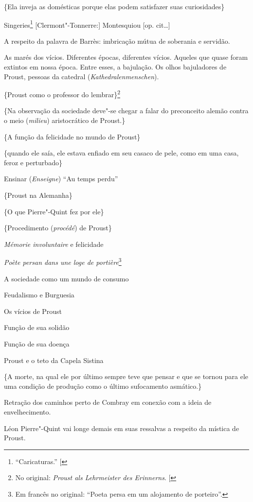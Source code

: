 \{Ela inveja as domésticas porque elas podem satisfazer suas
curiosidades\}

Singeries\footnote{``Caricaturas.'' {[}\versal{N. T.}{]}} {[}Clermont"-Tonnerre:{]} Montesquiou {[}op. cit\ldots{}{]}

A respeito da palavra de Barrès: imbricação mútua de soberania e
servidão.

As marés dos vícios. Diferentes épocas, diferentes vícios. Aqueles que
quase foram extintos em nossa época. Entre esses, a bajulação. Os olhos
bajuladores de Proust, pessoas da catedral (\emph{Kathedralenmenschen}).

\{Proust como o professor do lembrar\}\footnote{No original: \emph{Proust als Lehrmeister des Erinnerns}. {[}\versal{N. T.}{]}}

\{Na observação da sociedade deve"-se chegar a falar do preconceito
alemão contra o meio (\emph{milieu}) aristocrático de Proust.\}

\{A função da felicidade no mundo de Proust\}

\{quando ele saía, ele estava enfiado em seu casaco de pele, como em uma
casa, feroz e perturbado\}

Ensinar (\emph{Enseigne}) ``Au temps perdu''

\{Proust na Alemanha\}

\{O que Pierre"-Quint fez por ele\}

\{Procedimento (\emph{procédé}) de Proust\}

\emph{Mémorie involuntaire} e felicidade

\emph{Poète persan dans une loge de portière}\footnote{Em francês no original: ``Poeta
  persa em um alojamento de porteiro''. \versal{[N. T.]}}

A sociedade como um mundo de consumo

Feudalismo e Burguesia

Os vícios de Proust

Função de sua solidão

Função de sua doença

Proust e o teto da Capela Sistina

\{A morte, na qual ele por último sempre teve que pensar e que se tornou
para ele uma condição de produção como o último sufocamento asmático.\}

Retração dos caminhos perto de Combray em conexão com a ideia de
envelhecimento.

Léon Pierre"-Quint vai longe demais em suas ressalvas a respeito da
mística de Proust.

